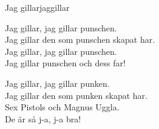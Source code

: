 \begin{song}{Jag gillar}{jaggillar}
\begin{vers}
Jag gillar, jag gillar punschen.\\
Jag gillar den som punschen skapat har.\\
Jag gillar, jag gillar punschen.\\
Jag gillar punschen och dess far!\\
\end{vers}
\begin{vers}
Jag gillar, jag gillar punken.\\
Jag gillar den som punken skapat har.\\
Sex Pistols och Magnus Uggla.\\
De är så j-a, j-a bra!
\end{vers}
\end{song}
